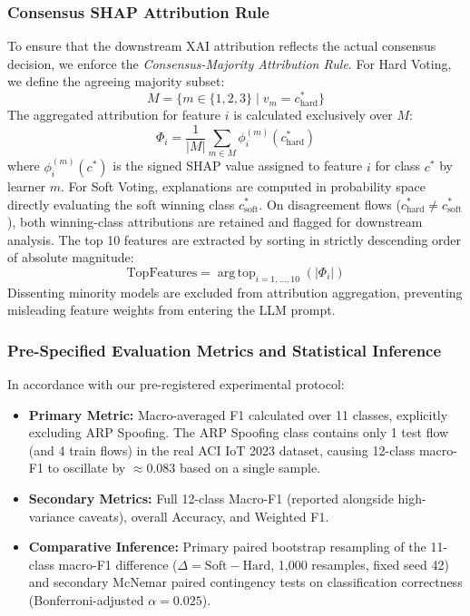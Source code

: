 \documentclass[conference]{IEEEtran}
\begin{document}
\subsubsection{Consensus SHAP Attribution Rule}
To ensure that the downstream XAI attribution reflects the actual consensus decision, we enforce the \textit{Consensus-Majority Attribution Rule}. For Hard Voting, we define the agreeing majority subset:
\begin{equation}
M = \{m \in \{1, 2, 3\} \mid v_m = c^*_{\text{hard}}\}
\end{equation}
The aggregated attribution for feature $i$ is calculated exclusively over $M$:
\begin{equation}
\Phi_i = \frac{1}{|M|} \sum_{m \in M} \phi_i^{(m)}(c^*_{\text{hard}})
\end{equation}
where $\phi_i^{(m)}(c^*)$ is the signed SHAP value assigned to feature $i$ for class $c^*$ by learner $m$. For Soft Voting, explanations are computed in probability space directly evaluating the soft winning class $c^*_{\text{soft}}$. On disagreement flows ($c^*_{\text{hard}} \neq c^*_{\text{soft}}$), both winning-class attributions are retained and flagged for downstream analysis. The top 10 features are extracted by sorting in strictly descending order of absolute magnitude:
\begin{equation}
\text{TopFeatures} = \operatorname{arg\,top}_{i=1,\dots,10} \left( |\Phi_i| \right)
\end{equation}
Dissenting minority models are excluded from attribution aggregation, preventing misleading feature weights from entering the LLM prompt.

\subsubsection{Pre-Specified Evaluation Metrics and Statistical Inference}
In accordance with our pre-registered experimental protocol:
\begin{itemize}
    \item \textbf{Primary Metric:} Macro-averaged F1 calculated over 11 classes, explicitly excluding ARP Spoofing. The ARP Spoofing class contains only 1 test flow (and 4 train flows) in the real ACI IoT 2023 dataset, causing 12-class macro-F1 to oscillate by $\approx 0.083$ based on a single sample.
    \item \textbf{Secondary Metrics:} Full 12-class Macro-F1 (reported alongside high-variance caveats), overall Accuracy, and Weighted F1.
    \item \textbf{Comparative Inference:} Primary paired bootstrap resampling of the 11-class macro-F1 difference ($\Delta = \text{Soft} - \text{Hard}$, 1,000 resamples, fixed seed 42) and secondary McNemar paired contingency tests on classification correctness (Bonferroni-adjusted $\alpha = 0.025$).
\end{itemize}
\end{document}
